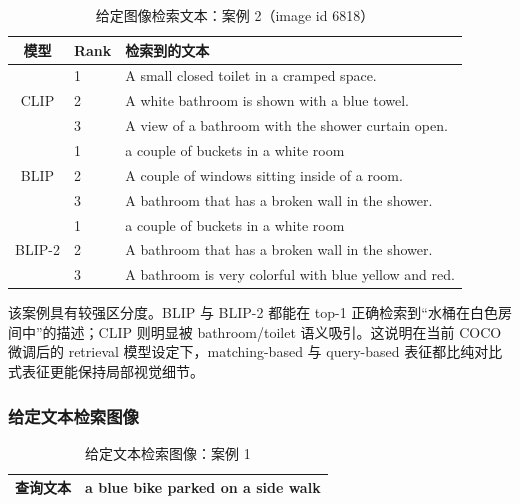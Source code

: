 \documentclass[UTF8,a4paper,10pt]{ctexart}
\begin{document}
\begin{table}[H]
    \centering
    \caption{给定图像检索文本：案例 2（image id 6818）}
    \begin{tabular}{clp{9cm}}
        \toprule
        模型 & Rank & 检索到的文本 \\
        \midrule
        \multirow{3}{*}{CLIP}
        & 1 & A small closed toilet in a cramped space. \\
        & 2 & A white bathroom is shown with a blue towel. \\
        & 3 & A view of a bathroom with the shower curtain open. \\
        \midrule
        \multirow{3}{*}{BLIP}
        & 1 & a couple of buckets in a white room \\
        & 2 & A couple of windows sitting inside of a room. \\
        & 3 & A bathroom that has a broken wall in the shower. \\
        \midrule
        \multirow{3}{*}{BLIP-2}
        & 1 & a couple of buckets in a white room \\
        & 2 & A bathroom that has a broken wall in the shower. \\
        & 3 & A bathroom is very colorful with blue yellow and red. \\
        \bottomrule
    \end{tabular}
\end{table}

该案例具有较强区分度。BLIP 与 BLIP-2 都能在 top-1 正确检索到“水桶在白色房间中”的描述；CLIP 则明显被 bathroom/toilet 语义吸引。这说明在当前 COCO 微调后的 retrieval 模型设定下，matching-based 与 query-based 表征都比纯对比式表征更能保持局部视觉细节。

\subsubsection{给定文本检索图像}

\begin{table}[H]
    \centering
    \caption{给定文本检索图像：案例 1}
    \begin{tabular}{p{3cm}p{11cm}}
        \toprule
        查询文本 & a blue bike parked on a side walk \\
        \bottomrule
    \end{tabular}
\end{table}
\end{document}
